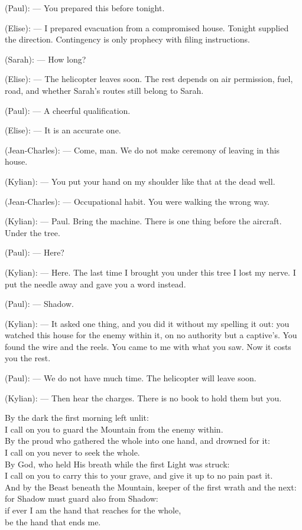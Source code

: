\begin{room}
(Paul): --- You prepared this before tonight.

(Elise): --- I prepared evacuation from a compromised house. Tonight supplied the direction. Contingency is only prophecy with filing instructions.

(Sarah): --- How long?

(Elise): --- The helicopter leaves soon. The rest depends on air permission, fuel, road, and whether Sarah's routes still belong to Sarah.

(Paul): --- A cheerful qualification.

(Elise): --- It is an accurate one.

(Jean-Charles): --- Come, man. We do not make ceremony of leaving in this house.

(Kylian): --- You put your hand on my shoulder like that at the dead well.

(Jean-Charles): --- Occupational habit. You were walking the wrong way.

(Kylian): --- Paul. Bring the machine. There is one thing before the aircraft. Under the tree.

\centerline{}

(Paul): --- Here?

(Kylian): --- Here. The last time I brought you under this tree I lost my nerve. I put the needle away and gave you a word instead.

(Paul): --- Shadow.

(Kylian): --- It asked one thing, and you did it without my spelling it out: you watched this house for the enemy within it, on no authority but a captive's. You found the wire and the reels. You came to me with what you saw. Now it costs you the rest.

(Paul): --- We do not have much time. The helicopter will leave soon.

(Kylian): --- Then hear the charges. There is no book to hold them but you.

\begin{scripture}
By the dark the first morning left unlit: \\
I call on you to guard the Mountain from the enemy within. \\
By the proud who gathered the whole into one hand, and drowned for it: \\
I call on you never to seek the whole. \\
By God, who held His breath while the first Light was struck: \\
I call on you to carry this to your grave, and give it up to no pain past it. \\
And by the Beast beneath the Mountain, keeper of the first wrath and the next: \\
for Shadow must guard also from Shadow: \\
if ever I am the hand that reaches for the whole, \\
be the hand that ends me.
\end{scripture}


\end{room}
